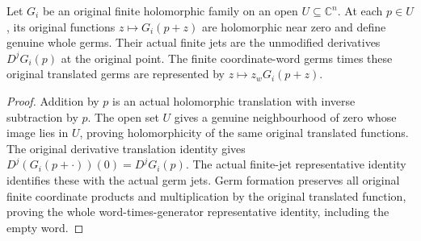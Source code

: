 \begin{lemma}
\label{hir:actual-original-translated-holomorphic-jets}
\leanok
{}
Let $G_i$ be an original finite holomorphic family on an open $U\subseteq
\mathbb C^n$. At each $p\in U$, its original functions $z\mapsto G_i(p+z)$
are holomorphic near zero and define genuine whole germs. Their actual finite
jets are the unmodified derivatives $D^jG_i(p)$ at the original point.
The finite coordinate-word germs times these original translated germs are
represented by $z\mapsto z_wG_i(p+z)$.
\end{lemma}
\begin{proof}
Addition by $p$ is an actual holomorphic translation with inverse subtraction
by $p$. The open set $U$ gives a genuine neighbourhood of zero whose image
lies in $U$, proving holomorphicity of the same original translated functions.
The original derivative translation identity gives
$D^j(G_i(p+\cdot))(0)=D^jG_i(p)$. The actual finite-jet representative
identity identifies these with the actual germ jets. Germ formation preserves
all original finite coordinate products and multiplication by the original
translated function, proving the whole word-times-generator representative
identity, including the empty word.
\end{proof}

